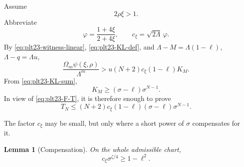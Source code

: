 \documentclass[11pt]{article}
\newtheorem{lemma}[theorem]{Lemma}
\numberwithin{equation}{section}
\begin{document}
Assume
\begin{equation}\label{eq:plt23-linear-branch}
  2\rho\xi>1.
\end{equation}
Abbreviate
\begin{equation}\label{eq:plt23-varphi-cxi}
  \varphi=\frac{1+4\xi}{2+4\xi},
  \qquad
  c_\xi=\sqrt{2\Lambda}\,\varphi.
\end{equation}
By \eqref{eq:plt23-witness-linear}, \eqref{eq:plt23-KL-def}, and
$\Lambda-M=\Lambda(1-\ell)$, $\Lambda-q=\Lambda u$,
\begin{equation}\label{eq:plt23-linear-payment-start}
  \frac{\Omega_m\psi(\xi,\rho)}{\Lambda^m}
  >u(N+2)c_\xi(1-\ell)K_M.
\end{equation}
From \eqref{eq:plt23-KL-sum},
\begin{equation}\label{eq:plt23-KL-first-term}
  K_M\ge(\sigma-\ell)\sigma^{N-1}.
\end{equation}
In view of \eqref{eq:plt23-F-T}, it is therefore enough to prove
\begin{equation}\label{eq:plt23-linear-core}
  T_N\le
  (N+2)c_\xi(1-\ell)(\sigma-\ell)\sigma^{N-1}.
\end{equation}

The factor $c_\xi$ may be small, but only where a short power of
$\sigma$ compensates for it.

\begin{lemma}[Compensation]\label{lem:plt23-compensation}
  On the whole admissible chart,
  \begin{equation}\label{eq:plt23-compensation}
    c_\xi\sigma^{\zeta/4}\ge1-\ell^2.
  \end{equation}
\end{lemma}
\end{document}
